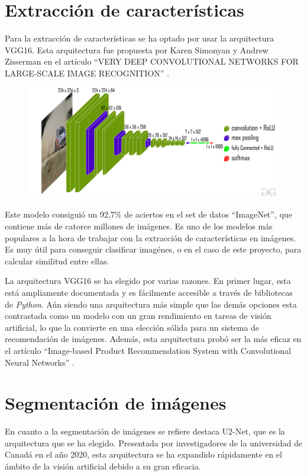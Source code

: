 \documentclass[12pt]{report} %
\begin{document}
	\section{Extracción de características}
	Para la extracción de características se ha optado por usar la arquitectura VGG16. Esta arquitectura fue propuesta por
	Karen Simonyan y Andrew Zisserman en el artículo ``VERY DEEP CONVOLUTIONAL NETWORKS FOR LARGE-SCALE IMAGE RECOGNITION'' \cite{vgg16-paper}.
	\begin{figure}[H]
		{\includegraphics[scale=0.3]{vgg-funcionamiento.jpg}}
	\end{figure}

	Este modelo consiguió un 92,7\% de aciertos en el set de datos ``ImageNet'', que contiene más de catorce millones de imágenes.
	Es uno de los modelos más populares a la hora de trabajar con la extracción de características en imágenes. Es muy útil para
	conseguir clasificar imagénes, o en el caso de este proyecto, para calcular similitud entre ellas.

	La arquitectura VGG16 se ha elegido por varias razones. En primer lugar, esta está ampliamente documentada y es fácilmente accesible
	a través de bibliotecas de \textit{Python}. Aún siendo una arquitectura más simple que las demás opciones esta contrastada como
	un modelo con un gran rendimiento en tareas de visión artificial, lo que la convierte en una elección sólida para un sistema de recomendación
	de imágenes. Además, esta arquitectura probó ser la más eficaz en el artículo ``Image-based Product Recommendation System with Convolutional Neural
	Networks'' \cite{stanford-paper}.

	\section{Segmentación de imágenes}
	En cuanto a la segmentación de imágenes se refiere destaca U2-Net, que es la arquitectura que se ha elegido.
	Presentada por investigadores de la universidad de Canadá en el año 2020, esta arquitectura se ha expandido
	rápidamente en el ámbito de la visión artificial debido a su gran eficacia.
\end{document}

